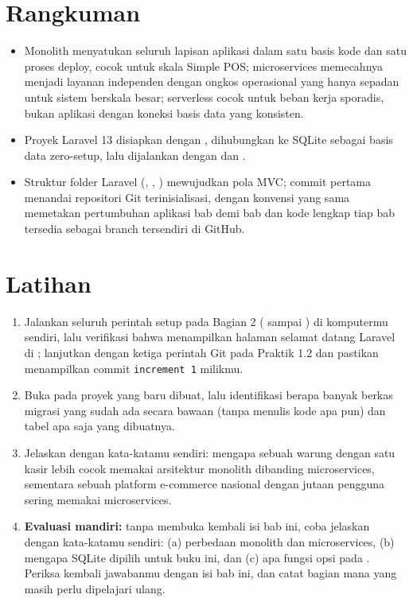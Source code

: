 
\section{Rangkuman}
\label{sec:arsitektur-web-modern-rangkuman}

\begin{itemize}
  \item Monolith menyatukan seluruh lapisan aplikasi dalam satu basis kode
    dan satu proses deploy, cocok untuk skala Simple POS; microservices
    memecahnya menjadi layanan independen dengan ongkos operasional yang
    hanya sepadan untuk sistem berskala besar; serverless cocok untuk beban
    kerja sporadis, bukan aplikasi dengan koneksi basis data yang konsisten.
  \item Proyek Laravel 13 disiapkan dengan ,
    dihubungkan ke SQLite sebagai basis data zero-setup, lalu dijalankan
    dengan  dan .
  \item Struktur folder Laravel (, ,
    ) mewujudkan pola MVC; commit
     pertama menandai repositori Git terinisialisasi,
    dengan konvensi yang sama memetakan pertumbuhan aplikasi bab demi bab
    dan kode lengkap tiap bab tersedia sebagai branch tersendiri di
    GitHub.
\end{itemize}

\section{Latihan}

\begin{enumerate}
  \item Jalankan seluruh perintah setup pada Bagian 2 ( sampai ) di komputermu sendiri, lalu
    verifikasi bahwa  menampilkan halaman selamat
    datang Laravel di ; lanjutkan dengan
    ketiga perintah Git pada Praktik 1.2 dan pastikan  menampilkan commit \texttt{increment 1} milikmu.
  \item Buka  pada proyek yang baru dibuat, lalu
    identifikasi berapa banyak berkas migrasi yang sudah ada secara bawaan
    (tanpa menulis kode apa pun) dan tabel apa saja yang dibuatnya.
  \item Jelaskan dengan kata-katamu sendiri: mengapa sebuah warung dengan
    satu kasir lebih cocok memakai arsitektur monolith dibanding
    microservices, sementara sebuah platform e-commerce nasional dengan
    jutaan pengguna sering memakai microservices.
  \item \textbf{Evaluasi mandiri:} tanpa membuka kembali isi bab ini, coba
    jelaskan dengan kata-katamu sendiri: (a) perbedaan monolith dan
    microservices, (b) mengapa SQLite dipilih untuk buku ini, dan (c) apa
    fungsi opsi  pada . Periksa kembali
    jawabanmu dengan isi bab ini, dan catat bagian mana yang masih perlu
    dipelajari ulang.
\end{enumerate}

